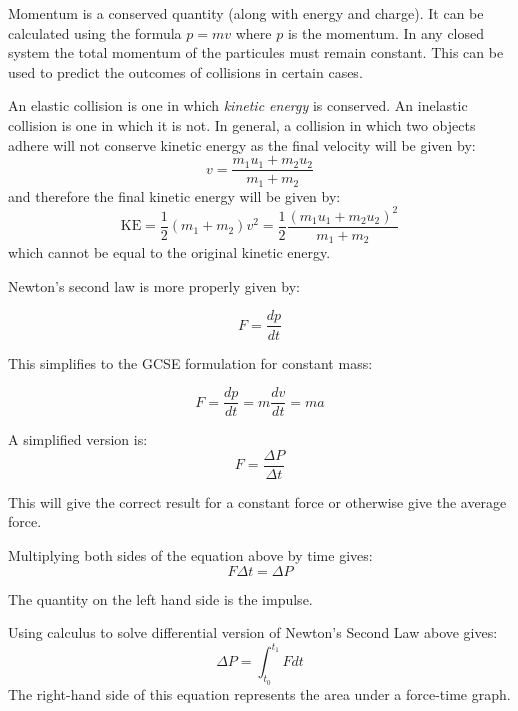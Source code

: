 \documentclass[revision-guide.tex]{subfiles}
\begin{document}

Momentum is a conserved quantity (along with energy and charge). It can be calculated using the formula $p=mv$ where $p$ is the momentum. In any closed system the total momentum of the particules must remain constant. This can be used to predict the outcomes of collisions in certain cases.


An elastic collision is one in which \emph{kinetic energy} is conserved. An inelastic collision is one in which it is not. In general, a collision in which two objects adhere will not conserve kinetic energy as the final velocity will be given by:
$$ v = \frac{m_1u_1+m_2u_2}{m_1+m_2} $$
and therefore the final kinetic energy will be given by:
\[ \text{KE} = \frac{1}{2}(m_1+m_2)v^2 = \frac{1}{2}\frac{\left( m_1u_1+m_2u_2\right)^2}{m_1+m_2}\]
which cannot be equal to the original kinetic energy.


Newton's second law is more properly given by:

\[ F = \frac{dp}{dt} \]

This simplifies to the GCSE formulation for constant mass:

\[ F = \frac{dp}{dt} = m\frac{dv}{dt} = ma \]

A simplified version is:
$$F = \frac{\Delta P}{\Delta t}$$

This will give the correct result for a constant force or otherwise give the average force.


Multiplying both sides of the equation above by time gives:
$$ F \Delta t = \Delta P $$

The quantity on the left hand side is the impulse.


Using calculus to solve differential version of Newton's Second Law above gives:
$$ \Delta P = \int_{t_0}^{t_1} F dt $$
The right-hand side of this equation represents the area under a force-time graph.
\end{document}
